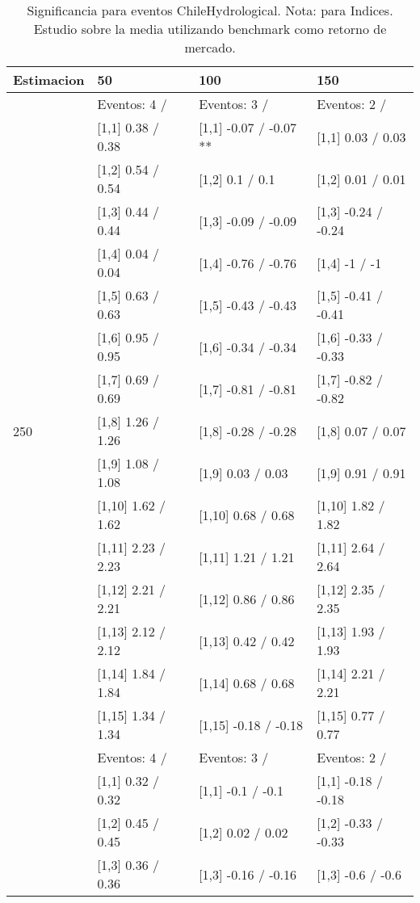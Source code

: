\begin{table}

\caption{Significancia para eventos ChileHydrological. Nota: para Indices. Estudio sobre la media utilizando benchmark como retorno de mercado.}
\centering
\begin{tabular}[t]{llll}
\toprule
Estimacion & 50 & 100 & 150\\
\midrule
 & Eventos:  4 / & Eventos:  3 / & Eventos:  2 /\\
 & {}[1,1] 0.38  / 0.38 & {}[1,1] -0.07  / -0.07 ** & {}[1,1] 0.03  / 0.03\\
 & {}[1,2] 0.54  / 0.54 & {}[1,2] 0.1  / 0.1 & {}[1,2] 0.01  / 0.01\\
 & {}[1,3] 0.44  / 0.44 & {}[1,3] -0.09  / -0.09 & {}[1,3] -0.24  / -0.24\\
 & {}[1,4] 0.04  / 0.04 & {}[1,4] -0.76  / -0.76 & {}[1,4] -1  / -1\\
\addlinespace
 & {}[1,5] 0.63  / 0.63 & {}[1,5] -0.43  / -0.43 & {}[1,5] -0.41  / -0.41\\
 & {}[1,6] 0.95  / 0.95 & {}[1,6] -0.34  / -0.34 & {}[1,6] -0.33  / -0.33\\
 & {}[1,7] 0.69  / 0.69 & {}[1,7] -0.81  / -0.81 & {}[1,7] -0.82  / -0.82\\
250 & {}[1,8] 1.26  / 1.26 & {}[1,8] -0.28  / -0.28 & {}[1,8] 0.07  / 0.07\\
 & {}[1,9] 1.08  / 1.08 & {}[1,9] 0.03  / 0.03 & {}[1,9] 0.91  / 0.91\\
\addlinespace
 & {}[1,10] 1.62  / 1.62 & {}[1,10] 0.68  / 0.68 & {}[1,10] 1.82  / 1.82\\
 & {}[1,11] 2.23  / 2.23 & {}[1,11] 1.21  / 1.21 & {}[1,11] 2.64  / 2.64\\
 & {}[1,12] 2.21  / 2.21 & {}[1,12] 0.86  / 0.86 & {}[1,12] 2.35  / 2.35\\
 & {}[1,13] 2.12  / 2.12 & {}[1,13] 0.42  / 0.42 & {}[1,13] 1.93  / 1.93\\
 & {}[1,14] 1.84  / 1.84 & {}[1,14] 0.68  / 0.68 & {}[1,14] 2.21  / 2.21\\
\addlinespace
 & {}[1,15] 1.34  / 1.34 & {}[1,15] -0.18  / -0.18 & {}[1,15] 0.77  / 0.77\\
 & Eventos:  4 / & Eventos:  3 / & Eventos:  2 /\\
 & {}[1,1] 0.32  / 0.32 & {}[1,1] -0.1  / -0.1 & {}[1,1] -0.18  / -0.18\\
 & {}[1,2] 0.45  / 0.45 & {}[1,2] 0.02  / 0.02 & {}[1,2] -0.33  / -0.33\\
 & {}[1,3] 0.36  / 0.36 & {}[1,3] -0.16  / -0.16 & {}[1,3] -0.6  / -0.6\\

\end{tabular}
\end{table}
